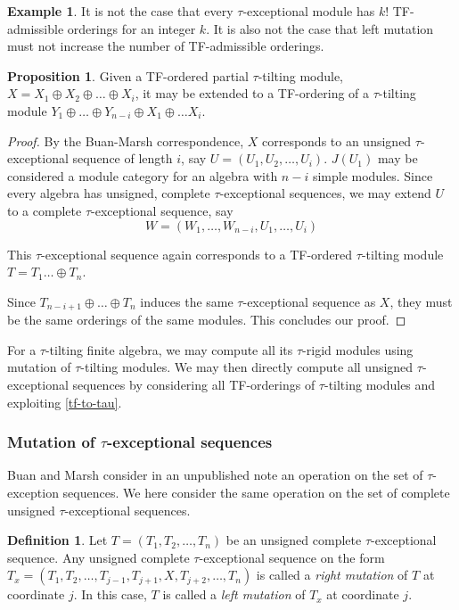 \documentclass[]{article}
\theoremstyle{definition}
\newtheorem{definition}{Definition}[section]
\newtheorem{proposition}{Proposition}[section]
\newtheorem{example}{Example}[section]
\newcommand{\tu}{\ensuremath{\tau}}
\begin{document}
\begin{example}
	It is not the case that every \tu-exceptional module has $k!$ TF-admissible orderings for an integer $k$. It is also not the case that left mutation must not increase the number of TF-admissible orderings.
 \end{example}
\begin{proposition}
	Given a TF-ordered partial \tu-tilting module, $X = X_1 \oplus X_2 \oplus \dots \oplus X_i$, it may be extended to a TF-ordering of a \tu-tilting module $Y_1 \oplus \dots \oplus Y_{n-i} \oplus X_1 \oplus \dots X_i$.
\end{proposition}

\begin{proof}
	By the Buan-Marsh correspondence, $X$ corresponds to an unsigned \tu-exceptional sequence of length $i$, say $U = (U_1,U_2,\dots,U_i)$. $J(U_1)$ may be considered a module category for an algebra with $n - i$ simple modules. Since every algebra has unsigned, complete \tu-exceptional sequences, we may extend $U$ to a complete $\tu$-exceptional sequence, say \[W = (W_1, \dots,  W_{n-i},  U_1, \dots, U_i)\] 
	
	This \tu-exceptional sequence again corresponds to a TF-ordered \tu-tilting module $T = T_1 \dots \oplus T_n$.
	
	Since $T_{n-i+1} \oplus \dots \oplus T_{n}$ induces the same \tu-exceptional sequence as $X$, they must be the same orderings of the same modules. This concludes our proof.
	
\end{proof}



For a $\tau$-tilting finite algebra, we may compute all its \tu-rigid modules using mutation of \tu-tilting modules. We may then directly compute all unsigned \tu-exceptional sequences by considering all TF-orderings of \tu-tilting modules and exploiting \cref{tf-to-tau}.

\subsubsection{Mutation of \tu-exceptional sequences}
Buan and Marsh consider in an unpublished note an operation on the set of \tu-exception sequences. We here consider the same operation on the set of complete unsigned \tu-exceptional sequences.

\begin{definition}
	Let $ T = (T_1,T_2,\dots,T_n)$ be an unsigned complete \tu-exceptional sequence. Any unsigned complete \tu-exceptional sequence on the form $T_x = (T_1,T_2,\dots,T_{j-1},T_{j+1},X,T_{j+2},\dots,T_n)$ is called a \textit{right mutation} of $T$ at coordinate $j$. In this case, $T$ is called a  \textit{left mutation} of $T_x$ at coordinate $j$.
\end{definition}
\end{document}
